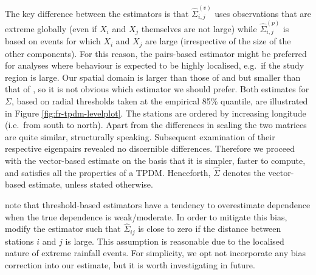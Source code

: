 \documentclass[en-GB, a4paper, nobind]{templates/bathreport}
\begin{document}
The key difference between the estimators is that \(\hat{\Sigma}_{i,j}^{(v)}\) uses observations that are extreme globally (even if \(X_i\) and \(X_j\) themselves are not large) while \(\hat{\Sigma}_{i,j}^{(p)}\) is based on events for which \(X_i\) and \(X_j\) are large (irrespective of the size of the other components). For this reason, the pairs-based estimator might be preferred for analyses where behaviour is expected to be highly localised, e.g.~if the study region is large. Our spatial domain is larger than those of \textcite{cooleyDecompositionsDependenceHighdimensional2019} and \textcite{rohrbeckSimulatingFloodEvent2021} but smaller than that of \textcite{jiangPrincipalComponentAnalysis2020}, so it is not obvious which estimator we should prefer. Both estimates for \(\Sigma\), based on radial thresholds taken at the empirical 85\% quantile, are illustrated in Figure \ref{fig:fr-tpdm-levelplot}. The stations are ordered by increasing longitude (i.e.~from south to north). Apart from the differences in scaling the two matrices are quite similar, structurally speaking. Subsequent examination of their respective eigenpairs revealed no discernible differences. Therefore we proceed with the vector-based estimate on the basis that it is simpler, faster to compute, and satisfies all the properties of a TPDM. Henceforth, \(\hat{\Sigma}\) denotes the vector-based estimate, unless stated otherwise.

\textcite{huserLikelihoodEstimatorsMultivariate2016} note that threshold-based estimators have a tendency to overestimate dependence when the true dependence is weak/moderate. In order to mitigate this bias, \textcite{fixSimultaneousAutoregressiveModels2021} modify the estimator such that \(\hat{\Sigma}_{ij}\) is close to zero if the distance between stations \(i\) and \(j\) is large. This assumption is reasonable due to the localised nature of extreme rainfall events. For simplicity, we opt not incorporate any bias correction into our estimate, but it is worth investigating in future.
\end{document}
